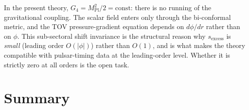 \documentclass[11pt]{article}
\begin{document}
In the present theory, $G_4 = M_{\mathrm{Pl}}^2/2 =
\mathrm{const}$: there is no running of the gravitational
coupling.  The scalar field enters only through the
bi-conformal metric, and the TOV pressure-gradient equation
depends on $d\phi/dr$ rather than on $\phi$.  This
sub-sectoral shift invariance is the structural reason
why $s_{\mathrm{excess}}$ is \emph{small} (leading order
$O(|\phi|)$) rather than $O(1)$, and is what makes the
theory compatible with pulsar-timing data at the
leading-order level.  Whether it is strictly zero at all
orders is the open task.

\section{Summary}\label{sec:summary_app16}
\end{document}
